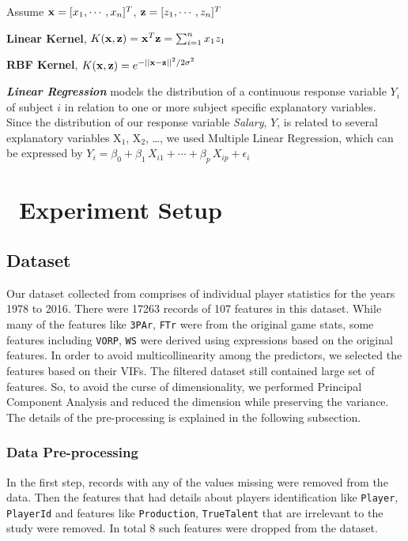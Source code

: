 \documentclass{article}
\begin{document}
\begin{center}
Assume ${\bf x}=[x_1,\cdots,x_n]^T$, ${\bf z}=[z_1,\cdots,z_n]^T$

\textbf{Linear Kernel}, $K({\bf x},{\bf z})={\bf x}^T {\bf z}=\sum_{i=1}^n x_1z_1$

\textbf{RBF Kernel}, $K({\bf x},{\bf z})=e^{-||{\bf x}-{\bf z}||^2/2\sigma^2}$
\end{center}
 
\textbf{\textit{Linear Regression}} models the distribution of a continuous response variable \(Y_i\) of subject \(i\) in relation to one or more subject specific explanatory variables. 
Since the distribution of our response variable \textit{Salary}, $Y$, is related to several explanatory variables X\(_{\text{1}}\), X\(_{\text{2}}\), \ldots{}, we used Multiple Linear Regression, which can be expressed by $Y_i=\beta_0+\beta_1\,X_{i1}+\cdots+\beta_p\,X_{ip}+\epsilon_i$

\section{\ Experiment Setup}

\subsection{Dataset}
Our dataset collected from \cite{NBA} comprises of individual player statistics for the years 1978 to 2016. There were 17263 records of 107 features in this dataset. While many of the features like \texttt{3PAr}, \texttt{FTr} were from the original game stats, some features including \texttt{VORP}, \texttt{WS} were derived using expressions based on the original features. In order to avoid multicollinearity among the predictors, we selected the features based on their VIFs. The filtered dataset still contained large set of features. So, to avoid the curse of dimensionality, we performed Principal Component Analysis and reduced the dimension while preserving the variance. The details of the pre-processing is explained in the following subsection.

\subsubsection{Data Pre-processing}

In the first step, records with any of the values missing were removed from the data. Then the features that had details about players identification like \texttt{Player}, \texttt{PlayerId} and features like \texttt{Production}, \texttt{TrueTalent} that are irrelevant to the study were removed. In total 8 such features were dropped from the dataset.
\end{document}
